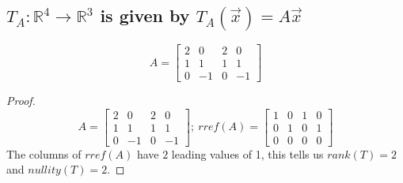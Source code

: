 \documentclass[../main.tex]{subfiles}
\begin{document}
\subsection{$T_A: \mathbb{R}^4 \to \mathbb{R}^3$ is given by $T_A(\vec{x}) = A\vec{x}$ }
$$ {A = \begin{bmatrix}
                                2 & 0  & 2 & 0  \\
                                1 & 1  & 1 & 1  \\
                                0 & -1 & 0 & -1
                        \end{bmatrix}}
$$
\begin{proof}
        \begin{equation*}
                A=\begin{bmatrix}
                        2 & 0  & 2 & 0  \\
                        1 & 1  & 1 & 1  \\
                        0 & -1 & 0 & -1
                \end{bmatrix} ;\ rref( A) =\begin{bmatrix}
                        1 & 0 & 1 & 0 \\
                        0 & 1 & 0 & 1 \\
                        0 & 0 & 0 & 0
                \end{bmatrix}
        \end{equation*}
        The columns of $\displaystyle rref( A)$ have $\displaystyle 2$ leading values of 1, this tells us $\displaystyle rank( T) =2$ and $\displaystyle nullity( T) =2$.
\end{proof}
\end{document}
